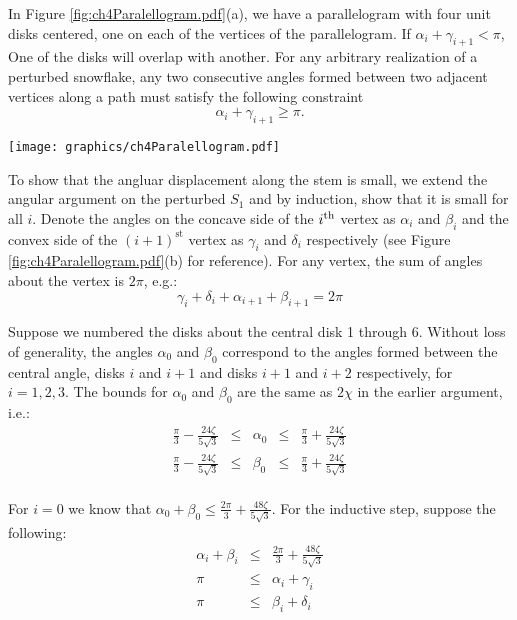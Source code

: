 In Figure \ref{fig:ch4Paralellogram.pdf}(a), we have a parallelogram with four unit disks centered, one on each of the vertices of the parallelogram.  
If $\alpha_i + \gamma_{i+1} < \pi$, One of the disks will overlap with another.  
For any arbitrary realization of a perturbed snowflake, any two consecutive angles formed between two adjacent vertices along a path must satisfy the following constraint $$\alpha_i + \gamma_{i+1} \geq \pi.$$

\begin{minipage}{\linewidth}
\begin{center}
\texttt{[image: graphics/ch4Paralellogram.pdf]}
\label{fig:ch4Paralellogram.pdf}
\end{center}
\end{minipage}

To show that the angluar displacement along the stem is small, we extend the angular argument on the perturbed $S_1$ and by induction, show that it is small for all $i$.  
Denote the angles on the concave side of the $i^\text{th}$ vertex as $\alpha_i$ and $\beta_i$ and the convex side of the $(i+1)^\text{st}$ vertex as $\gamma_i$ and $\delta_i$ respectively (see Figure \ref{fig:ch4Paralellogram.pdf}(b) for reference). 
For any vertex, the sum of angles about the vertex is $2 \pi$, e.g.:
$$\gamma_i + \delta_i + \alpha_{i+1} + \beta_{i+1} = 2 \pi$$ 

Suppose we numbered the disks about the central disk 1 through 6.  
Without loss of generality, the angles $\alpha_0$ and $\beta_0$ correspond to the angles formed between the central angle, disks $i$ and $i+1$ and disks $i+1$ and $i+2$ respectively, for $i = 1,2,3$.  
The bounds for $\alpha_0$ and $\beta_0$ are the same as $2\chi$ in the earlier argument, i.e.:
$$
\begin{array}{rcccl}
\frac{\pi}{3} - \frac{24 \zeta}{5\sqrt{3}} &\leq& \alpha_0 &\leq& \frac{\pi}{3} + \frac{24 \zeta}{5\sqrt{3}}\\
\frac{\pi}{3} - \frac{24 \zeta}{5\sqrt{3}} &\leq& \beta_0  &\leq& \frac{\pi}{3} + \frac{24 \zeta}{5\sqrt{3}}\\
\end{array}
$$

For $i=0$ we know that $\alpha_0 + \beta_0 \leq \frac{2\pi}{3} + \frac{48 \zeta}{5\sqrt{3}}.$
For the inductive step, suppose the following:
$$
\begin{array}{rcl}
\alpha_i +\beta_i &\leq& \frac{2 \pi}{3} + \frac{48 \zeta}{5\sqrt3}\\
\pi &\leq& \alpha_i + \gamma_i \\
\pi &\leq& \beta_i + \delta_i
\end{array}
$$ 


